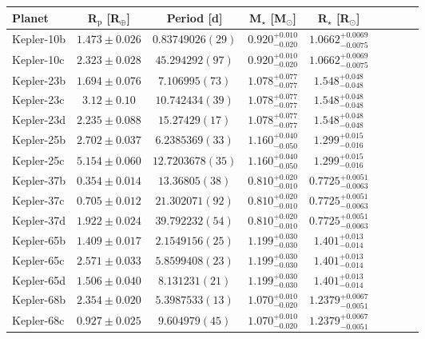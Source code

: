 \documentclass[a4paper,fleqn,usenatbib]{mnras}
\begin{document}
\renewcommand{\arraystretch}{1.6}
\begin{table*}
\begin{tabular}{lcccccccc}
Planet	&	R$_\mathrm{p}$ [R$_\oplus$] & Period [d] & M$_\star$ [M$_\odot$]	&R$_\star$ [R$_\odot$]\\
\hline
Kepler-10b&	    $1.473 \pm 0.026$	&$0.83749026 (29)$	&$0.920_{-0.020}^{+0.010}$	&$1.0662_{-0.0075}^{+0.0069}$\\               
Kepler-10c&	    $2.323 \pm 0.028$	&$45.294292 (97)$	&$0.920_{-0.020}^{+0.010}$	&$1.0662_{-0.0075}^{+0.0069}$\\               
Kepler-23b& 	$1.694 \pm 0.076$	&$7.106995 (73)$	&$1.078_{-0.077}^{+0.077}$	&$1.548_{-0.048}^{+0.048}$	\\               
Kepler-23c& 	$3.12 \pm 0.10$	   &$10.742434 (39)$	&$1.078_{-0.077}^{+0.077}$	&$1.548_{-0.048}^{+0.048}$	\\               
Kepler-23d& 	$2.235 \pm 0.088$	&$15.27429 (17)$	&$1.078_{-0.077}^{+0.077}$	&$1.548_{-0.048}^{+0.048}$	\\               
Kepler-25b& 	$2.702 \pm 0.037$	&$6.2385369 (33)$	&$1.160_{-0.050}^{+0.040}$	&$1.299_{-0.016}^{+0.015}$		\\           
Kepler-25c& 	$5.154 \pm 0.060$	&$12.7203678 (35)$	&$1.160_{-0.050}^{+0.040}$	&$1.299_{-0.016}^{+0.015}$		\\           
Kepler-37b& 	$0.354 \pm 0.014$	&$13.36805 (38)$	&$0.810_{-0.010}^{+0.020}$	&$0.7725_{-0.0063}^{+0.0051}$\\               
Kepler-37c& 	$0.705 \pm 0.012$	&$21.302071 (92)$	&$0.810_{-0.010}^{+0.020}$	&$0.7725_{-0.0063}^{+0.0051}$\\               
Kepler-37d& 	$1.922 \pm 0.024$	&$39.792232 (54)$	&$0.810_{-0.010}^{+0.020}$	&$0.7725_{-0.0063}^{+0.0051}$\\               
Kepler-65b& 	$1.409 \pm 0.017$	&$2.1549156 (25)$	&$1.199_{-0.030}^{+0.030}$	&$1.401_{-0.014}^{+0.013}$		\\           
Kepler-65c& 	$2.571 \pm 0.033$	&$5.8599408 (23)$	&$1.199_{-0.030}^{+0.030}$	&$1.401_{-0.014}^{+0.013}$		\\           
Kepler-65d& 	$1.506 \pm 0.040$	&$8.131231 (21)$	&$1.199_{-0.030}^{+0.030}$	&$1.401_{-0.014}^{+0.013}$		\\           
Kepler-68b& 	$2.354 \pm 0.020$	&$5.3987533 (13)$	&$1.070_{-0.020}^{+0.010}$	&$1.2379_{-0.0051}^{+0.0067}$\\               
Kepler-68c& 	$0.927 \pm 0.025$	&$9.604979 (45)$	&$1.070_{-0.020}^{+0.010}$	&$1.2379_{-0.0051}^{+0.0067}$\\

\end{tabular}
\end{table*}
\end{document}
